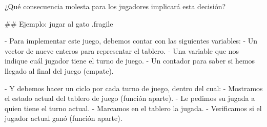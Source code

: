 \bgnblockdanger
¿Qué consecuencia molesta para los jugadores implicará esta decisión?
\trmblockdanger

## Ejemplo: jugar al gato {.fragile}


- Para implementar este juego, debemos contar con las siguientes variables:
    - Un vector de nueve enteros para representar el tablero.
    - Una variable que nos indique cuál jugador tiene el turno de juego.
    - Un contador para saber si hemos llegado al final del juego (empate).


- Y debemos hacer un ciclo por cada turno de juego, dentro del cual:
    - Mostramos el estado actual del tablero de juego (función aparte).
    - Le pedimos su jugada a quien tiene el turno actual.
    - Marcamos en el tablero la jugada.
    - Verificamos si el jugador actual ganó (función aparte).

